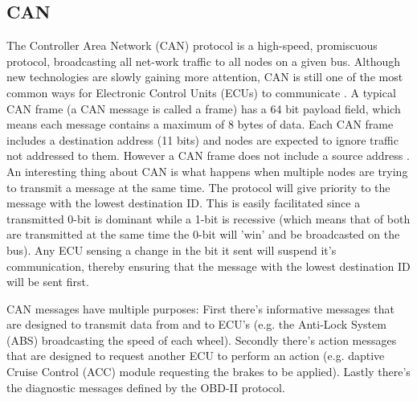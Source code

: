 \documentclass[11pt]{article}
\begin{document}
\subsection{CAN}
The Controller Area Network (CAN) protocol is a high-speed, promiscuous protocol, broadcasting all net-work traffic to all nodes on a given bus. Although new technologies are slowly gaining more attention, CAN is still one of the most common ways for Electronic Control Units (ECUs) to communicate \cite{MillerB}. A typical CAN frame (a CAN message is called a frame) has a 64 bit payload field, which means each message contains a maximum of 8 bytes of data. Each CAN frame includes a destination address (11 bits) and nodes are expected to ignore traffic not addressed to them. However a CAN frame does not include a source address \cite{Klinedinst05}. An interesting thing about CAN is what happens when multiple nodes are trying to transmit a message at the same time. The protocol will give priority to the message with the lowest destination ID. This is easily facilitated since a transmitted 0-bit is dominant while a 1-bit is recessive (which means that of both are transmitted at the same time the 0-bit will 'win' and be broadcasted on the bus). Any ECU sensing a change in the bit it sent will suspend it's communication, thereby ensuring that the message with the lowest destination ID will be sent first.\cite{CANwiki}\newline

CAN messages have multiple purposes: First there's informative messages that are designed to transmit data from and to ECU's (e.g. the Anti-Lock System (ABS) broadcasting the speed of each wheel). Secondly there's action messages that are designed to request another ECU to perform an action (e.g. daptive Cruise Control (ACC) module requesting the brakes to be applied). Lastly there's the diagnostic messages defined by the OBD-II protocol. \cite{MillerB} 
\end{document}

